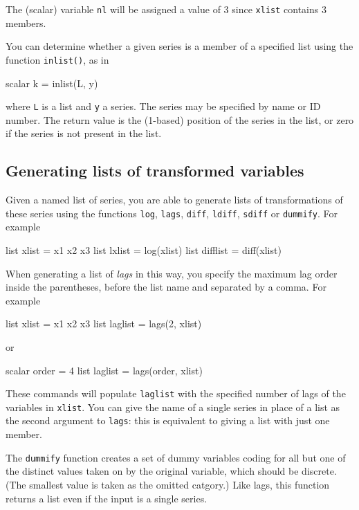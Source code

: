 The (scalar) variable \texttt{nl} will be assigned a value of 3 since
\texttt{xlist} contains 3 members.

You can determine whether a given series is a member of a specified
list using the function \texttt{inlist()}, as in
%
\begin{code}
scalar k = inlist(L, y)
\end{code}
%
where \texttt{L} is a list and \texttt{y} a series. The series may
be specified by name or ID number. The return value is the (1-based)
position of the series in the list, or zero if the series is not
present in the list. 

\subsection{Generating lists of transformed variables}
\label{sec:transform-lists}

Given a named list of series, you are able to generate lists of
transformations of these series using the functions \texttt{log},
\texttt{lags}, \texttt{diff}, \texttt{ldiff}, \texttt{sdiff} or
\texttt{dummify}.  For example
%
\begin{code}
list xlist = x1 x2 x3
list lxlist = log(xlist)
list difflist = diff(xlist)
\end{code}

When generating a list of \textit{lags} in this way, you specify the
maximum lag order inside the parentheses, before the list name and
separated by a comma.  For example
%
\begin{code}
list xlist = x1 x2 x3
list laglist = lags(2, xlist)
\end{code}
%
or
%
\begin{code}
scalar order = 4
list laglist = lags(order, xlist)
\end{code}

These commands will populate \texttt{laglist} with the specified
number of lags of the variables in \texttt{xlist}.  You can give the
name of a single series in place of a list as the second argument to
\texttt{lags}: this is equivalent to giving a list with just one
member.

The \texttt{dummify} function creates a set of dummy variables coding
for all but one of the distinct values taken on by the original
variable, which should be discrete.  (The smallest value is taken as
the omitted catgory.)  Like lags, this function returns a list even if
the input is a single series.

